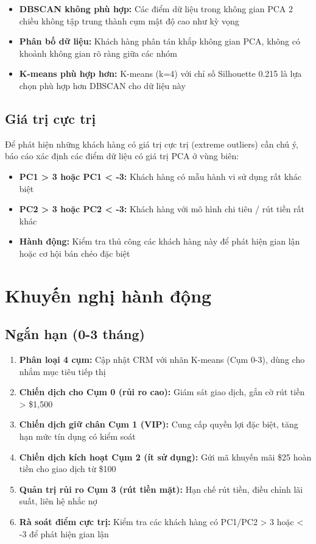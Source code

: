 \begin{itemize}
    \item \textbf{DBSCAN không phù hợp:} Các điểm dữ liệu trong không gian PCA 2 chiều không tập trung thành cụm mật độ cao như kỳ vọng
    \item \textbf{Phân bố dữ liệu:} Khách hàng phân tán khắp không gian PCA, không có khoảnh không gian rõ ràng giữa các nhóm
    \item \textbf{K-means phù hợp hơn:} K-means (k=4) với chỉ số Silhouette 0.215 là lựa chọn phù hợp hơn DBSCAN cho dữ liệu này
\end{itemize}

\subsection{Giá trị cực trị}

Để phát hiện những khách hàng có giá trị cực trị (extreme outliers) cần chú ý, báo cáo xác định các điểm dữ liệu có giá trị PCA ở vùng biên:

\begin{itemize}
    \item \textbf{PC1 > 3 hoặc PC1 < -3:} Khách hàng có mẫu hành vi sử dụng rất khác biệt
    \item \textbf{PC2 > 3 hoặc PC2 < -3:} Khách hàng với mô hình chi tiêu / rút tiền rất khác
    \item \textbf{Hành động:} Kiểm tra thủ công các khách hàng này để phát hiện gian lận hoặc cơ hội bán chéo đặc biệt
\end{itemize}

\section{Khuyến nghị hành động}

\subsection{Ngắn hạn (0-3 tháng)}

\begin{enumerate}
    \item \textbf{Phân loại 4 cụm:} Cập nhật CRM với nhãn K-means (Cụm 0-3), dùng cho nhắm mục tiêu tiếp thị
    \item \textbf{Chiến dịch cho Cụm 0 (rủi ro cao):} Giám sát giao dịch, gắn cờ rút tiền > \$1,500
    \item \textbf{Chiến dịch giữ chân Cụm 1 (VIP):} Cung cấp quyền lợi đặc biệt, tăng hạn mức tín dụng có kiểm soát
    \item \textbf{Chiến dịch kích hoạt Cụm 2 (ít sử dụng):} Gửi mã khuyến mãi \$25 hoàn tiền cho giao dịch từ \$100
    \item \textbf{Quản trị rủi ro Cụm 3 (rút tiền mặt):} Hạn chế rút tiền, điều chỉnh lãi suất, liên hệ nhắc nợ
    \item \textbf{Rà soát điểm cực trị:} Kiểm tra các khách hàng có PC1/PC2 > 3 hoặc < -3 để phát hiện gian lận
\end{enumerate}

